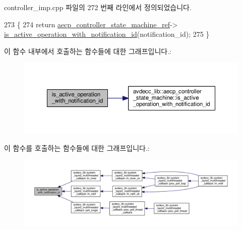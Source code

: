 controller\+\_\+imp.\+cpp 파일의 272 번째 라인에서 정의되었습니다.


\begin{DoxyCode}
273 \{
274     \textcolor{keywordflow}{return} \hyperlink{namespaceavdecc__lib_a0b1b5aea3c0490f77cbfd9178af5be22}{aecp\_controller\_state\_machine\_ref}->
      \hyperlink{classavdecc__lib_1_1aecp__controller__state__machine_a478e43b65aafe1a0e927e84304047003}{is\_active\_operation\_with\_notification\_id}(notification\_id);
275 \}
\end{DoxyCode}


이 함수 내부에서 호출하는 함수들에 대한 그래프입니다.\+:
\nopagebreak
\begin{figure}[H]
\begin{center}
\leavevmode
\includegraphics[width=350pt]{classavdecc__lib_1_1controller__imp_a478e43b65aafe1a0e927e84304047003_cgraph}
\end{center}
\end{figure}




이 함수를 호출하는 함수들에 대한 그래프입니다.\+:
\nopagebreak
\begin{figure}[H]
\begin{center}
\leavevmode
\includegraphics[width=350pt]{classavdecc__lib_1_1controller__imp_a478e43b65aafe1a0e927e84304047003_icgraph}
\end{center}
\end{figure}


